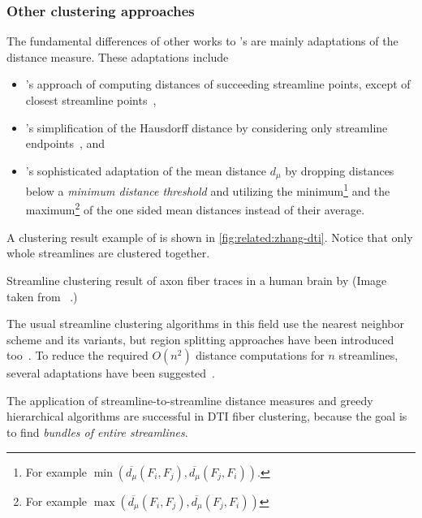 \subsubsection{Other clustering approaches}

The fundamental differences of other works to 's are mainly adaptations of the distance measure. These adaptations include 
\begin{itemize}
%
  \item {}'s approach of computing distances of succeeding streamline points, except of closest streamline points~\cite{Ding},
%
  \item {}'s simplification of the Hausdorff distance by considering only streamline endpoints~\cite{Brun}, and
%
  \item {}'s sophisticated adaptation of the mean distance $d_\mu$ by dropping distances below a \emph{minimum distance threshold} and utilizing the minimum\footnote{For example $\min(\overline{d_\mu}(F_i, F_j), \overline{d_\mu}(F_j, F_i))$.} and the maximum\footnote{For example $\max(\overline{d_\mu}(F_i, F_j), \overline{d_\mu}(F_j, F_i))$} of the one sided mean distances instead of their average.
%
\end{itemize}

A clustering result example of  is shown in \autoref{fig:related:zhang-dti}. Notice that only whole streamlines are clustered together.

\normfigure[pos=tbhp,
            label={fig:related:zhang-dti},
            shortcaption={\acs{DTI} fiber clustering result.},
           ]
{rel-zhang-dti}
{Streamline clustering result of axon fiber traces in a human brain by  (Image taken from ~\cite{Zhang}.)}


The usual streamline clustering algorithms in this field use the nearest neighbor scheme and its variants, but region splitting approaches have been introduced too~\cite{Brun, ODonnell}. To reduce the required $O(n^2)$ distance computations for $n$ streamlines, several adaptations have been suggested~\cite{Xia, Maddah, ODonnell}.


The application of streamline-to-streamline distance measures and greedy hierarchical algorithms are successful in \ac{DTI} fiber clustering, because the goal is to find \emph{bundles of entire streamlines}.






